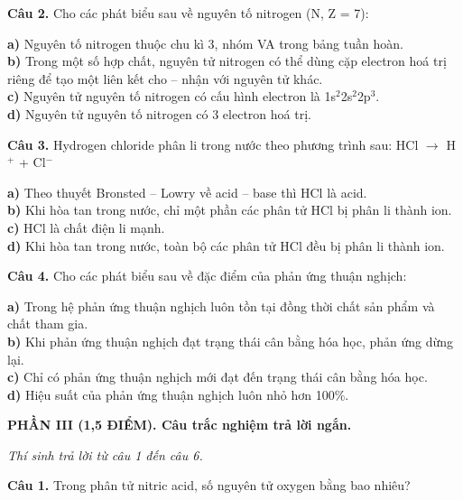 \documentclass[13pt,a4paper]{article}
\begin{document}
\textbf{Câu 2.} Cho các phát biểu sau về nguyên tố nitrogen (N, Z = 7):

\textbf{a)} Nguyên tố nitrogen thuộc chu kì 3, nhóm VA trong bảng tuần hoàn.\\
\textbf{b)} Trong một số hợp chất, nguyên tử nitrogen có thể dùng cặp electron hoá trị riêng để tạo một liên kết cho – nhận với nguyên tử khác.\\
\textbf{c)} Nguyên tử nguyên tố nitrogen có cấu hình electron là 1s$^{2}$2s$^{2}$2p$^{3}$.\\
\textbf{d)} Nguyên tử nguyên tố nitrogen có 3 electron hoá trị.\\
\vspace{2.0cm}

\textbf{Câu 3.} Hydrogen chloride phân li trong nước theo phương trình sau: HCl $\longrightarrow$ H$^{+}$ + Cl$^{-}$

\textbf{a)} Theo thuyết Bronsted – Lowry về acid – base thì HCl là acid.\\
\textbf{b)} Khi hòa tan trong nước, chỉ một phần các phân tử HCl bị phân li thành ion.\\
\textbf{c)} HCl là chất điện li mạnh.\\
\textbf{d)} Khi hòa tan trong nước, toàn bộ các phân tử HCl đều bị phân li thành ion.\\
\vspace{2.0cm}

\textbf{Câu 4.} Cho các phát biểu sau về đặc điểm của phản ứng thuận nghịch:

\textbf{a)} Trong hệ phản ứng thuận nghịch luôn tồn tại đồng thời chất sản phẩm và chất tham gia.\\
\textbf{b)} Khi phản ứng thuận nghịch đạt trạng thái cân bằng hóa học, phản ứng dừng lại.\\
\textbf{c)} Chỉ có phản ứng thuận nghịch mới đạt đến trạng thái cân bằng hóa học.\\
\textbf{d)} Hiệu suất của phản ứng thuận nghịch luôn nhỏ hơn 100\%.\\
\vspace{2.0cm}

\vspace{6pt}
{\color{myGreen}\bfseries\large PHẦN III (1,5 ĐIỂM). Câu trắc nghiệm trả lời ngắn.}

\textit{\small Thí sinh trả lời từ câu 1 đến câu 6.}
\vspace{3pt}

\textbf{Câu 1.} Trong phân tử nitric acid, số nguyên tử oxygen bằng bao nhiêu?
\end{document}

